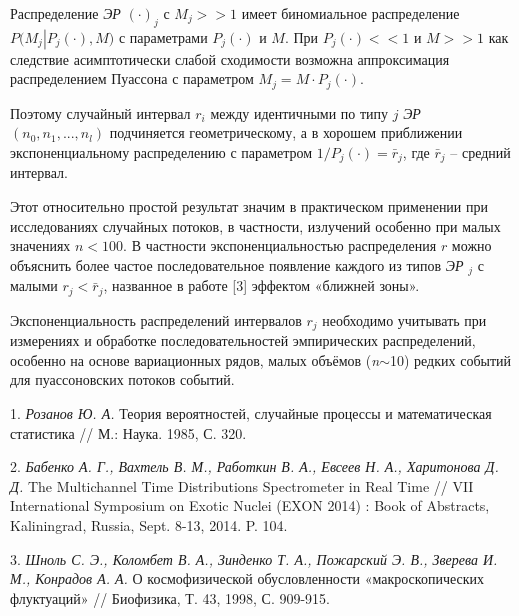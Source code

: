 Распределение {\it ЭР} $(\cdot )_{j} $ с  $M_{j} >>1$  имеет биномиальное распределение $P(M_{j} \left|P_{j} (\cdot),M)\right. $ с параметрами $P_{j} (\cdot)$ и $M$. При $P_{j} (\cdot )<<1$  и $M>>1$  как следствие асимптотически слабой сходимости возможна аппроксимация распределением Пуассона с параметром $M_{j} =M\cdot P_{j} (\cdot)$.

Поэтому случайный интервал $r_{i} $ между идентичными по типу $j$  {\it ЭР} $ ( n_{0} ,  n_{1} ,  ...  ,  n_{l} )$ подчиняется геометрическому, а в хорошем приближении экспоненциальному  распределению  с параметром $1/P_{j} (\cdot)=\bar{r}_{j} $, где $\bar{r}_{j} $ -- средний интервал.


Этот относительно простой результат значим в практическом применении при исследованиях случайных потоков, в частности, излучений особенно при малых значениях $n<100$. В частности экспоненциальностью распределения $r$ можно объяснить более частое последовательное  появление  каждого из типов {\it ЭР} $ _{j} $ с малыми $r_{j} <\bar{r}_{j} $, названное в работе [3] эффектом «ближней зоны».


Экспоненциальность распределений интервалов $r_{j} $ необходимо учитывать при измерениях и обработке последовательностей эмпирических распределений, особенно на основе вариационных рядов, малых объёмов (\textit{n}$\sim$10) редких событий для пуассоновских потоков событий.


\litlist

1. {\it Розанов Ю. А.} Теория вероятностей, случайные процессы и математическая статистика // М.: Наука.  1985, С. 320.

2. {\it Бабенко А. Г., Вахтель В. М., Работкин В. А., Евсеев Н. А., Харитонова Д. Д.}
\foreignlanguage{english}{
	The Multichannel Time Distributions Spectrometer in Real Time // VII International Symposium on Exotic Nuclei (EXON 2014) : Book of Abstracts, Kaliningrad, Russia, Sept. 8-13, 2014. P. 104.
}

3. {\it Шноль С. Э., Коломбет В. А., Зинденко  Т. А., Пожарский Э. В., Зверева И. М., Конрадов А. А.} О космофизической обусловленности «макроскопических флуктуаций» // Биофизика, Т. 43, 1998, С. 909-915.
